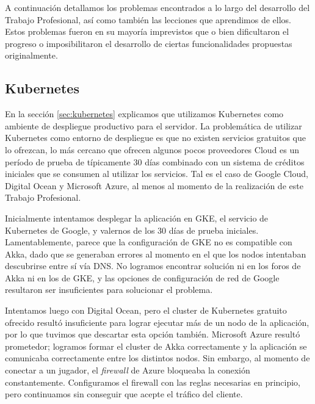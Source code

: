 
\noindent A continuación detallamos los problemas encontrados a lo largo del desarrollo del
Trabajo Profesional, así como también las lecciones que aprendimos de ellos. Estos problemas fueron en su mayoría imprevistos que o bien
dificultaron el progreso o imposibilitaron el desarrollo de ciertas funcionalidades propuestas originalmente.

\subsection{Kubernetes}
\label{sec:lessons-kubernetes}

\noindent En la sección \ref{sec:kubernetes} explicamos que utilizamos Kubernetes como ambiente de despliegue productivo para
el servidor. La problemática de utilizar Kubernetes como entorno de despliegue es que no existen servicios gratuitos que lo ofrezcan,
lo más cercano que ofrecen algunos pocos proveedores Cloud es un período de prueba de típicamente 30 días combinado con un sistema de
créditos iniciales que se consumen al utilizar los servicios. Tal es el caso de Google Cloud, Digital Ocean y Microsoft Azure, al menos al momento
de la realización de este Trabajo Profesional.

Inicialmente intentamos desplegar la aplicación en GKE, el servicio de Kubernetes de Google, y valernos de los 30 días de prueba iniciales. Lamentablemente,
parece que la configuración de GKE no es compatible con Akka, dado que se generaban errores al momento en el que los nodos intentaban descubrirse entre sí vía
DNS. No logramos encontrar solución ni en los foros de Akka ni en los de GKE, y las opciones de configuración de red de Google resultaron ser insuficientes para
solucionar el problema.

Intentamos luego con Digital Ocean, pero el cluster de Kubernetes gratuito ofrecido resultó insuficiente para lograr ejecutar más de un nodo de la aplicación, por lo que
tuvimos que descartar esta opción también. Microsoft Azure resultó prometedor; logramos formar el cluster de Akka correctamente y la aplicación se comunicaba correctamente entre
los distintos nodos. Sin embargo, al momento de conectar a un jugador, el \textit{firewall} de Azure bloqueaba la conexión constantemente. Configuramos el firewall con las reglas necesarias
en principio, pero continuamos sin conseguir que acepte el tráfico del cliente.

